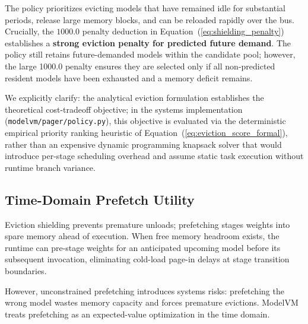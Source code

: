 The policy prioritizes evicting models that have remained idle for substantial periods, release large memory blocks, and can be reloaded rapidly over the bus. Crucially, the $1000.0$ penalty deduction in Equation~(\ref{eq:shielding_penalty}) establishes a \textbf{strong eviction penalty for predicted future demand}. The policy still retains future-demanded models within the candidate pool; however, the large 1000.0 penalty ensures they are selected only if all non-predicted resident models have been exhausted and a memory deficit remains.

We explicitly clarify: the analytical eviction formulation establishes the theoretical cost-tradeoff objective; in the systems implementation (\texttt{modelvm/pager/policy.py}), this objective is evaluated via the deterministic empirical priority ranking heuristic of Equation~(\ref{eq:eviction_score_formal}), rather than an expensive dynamic programming knapsack solver that would introduce per-stage scheduling overhead and assume static task execution without runtime branch variance.

\subsection{Time-Domain Prefetch Utility}
\label{sec:prefetch_utility}

Eviction shielding prevents premature unloads; prefetching stages weights into spare memory ahead of execution. When free memory headroom exists, the runtime can pre-stage weights for an anticipated upcoming model before its subsequent invocation, eliminating cold-load page-in delays at stage transition boundaries.

However, unconstrained prefetching introduces systems risks: prefetching the wrong model wastes memory capacity and forces premature evictions. ModelVM treats prefetching as an expected-value optimization in the time domain.


